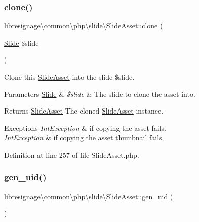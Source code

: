 \subsubsection{\texorpdfstring{clone()}{clone()}}
{\footnotesize\ttfamily libresignage\textbackslash{}common\textbackslash{}php\textbackslash{}slide\textbackslash{}\+Slide\+Asset\+::clone (\begin{DoxyParamCaption}\item[{\hyperlink{classlibresignage_1_1common_1_1php_1_1slide_1_1Slide}{Slide}}]{\$slide }\end{DoxyParamCaption})}

Clone this \hyperlink{classlibresignage_1_1common_1_1php_1_1slide_1_1SlideAsset}{Slide\+Asset} into the slide \$slide.


\begin{DoxyParams}[1]{Parameters}
\hyperlink{classlibresignage_1_1common_1_1php_1_1slide_1_1Slide}{Slide} & {\em \$slide} & The slide to clone the asset into.\\
\hline
\end{DoxyParams}
\begin{DoxyReturn}{Returns}
\hyperlink{classlibresignage_1_1common_1_1php_1_1slide_1_1SlideAsset}{Slide\+Asset} The cloned \hyperlink{classlibresignage_1_1common_1_1php_1_1slide_1_1SlideAsset}{Slide\+Asset} instance.
\end{DoxyReturn}

\begin{DoxyExceptions}{Exceptions}
{\em Int\+Exception} & if copying the asset fails. \\
\hline
{\em Int\+Exception} & if copying the asset thumbnail fails. \\
\hline
\end{DoxyExceptions}


Definition at line 257 of file Slide\+Asset.\+php.

\mbox{\label{classlibresignage_1_1common_1_1php_1_1slide_1_1SlideAsset_a39be23fb06691455692a9afbb5c451ae}} 
\subsubsection{\texorpdfstring{gen\+\_\+uid()}{gen\_uid()}}
{\footnotesize\ttfamily libresignage\textbackslash{}common\textbackslash{}php\textbackslash{}slide\textbackslash{}\+Slide\+Asset\+::gen\+\_\+uid (\begin{DoxyParamCaption}{ }\end{DoxyParamCaption})}

